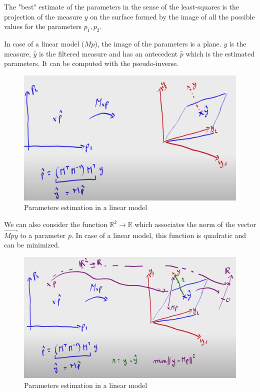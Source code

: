 The "best" estimate of the parameters in the sense of the least-squares is the projection of the measure $y$ on the surface formed by the image of all the possible values for the parameters $p_1, p_2$.



In case of a linear model ($Mp$), the image of the parameters is a plane. $y$ is the measure, $\hat{y}$ is the filtered measure and has an antecedent $\hat{p}$ which is the estimated parameters. It can be computed with the pseudo-inverse.

\begin{figure}[H]
    \centering
    \includegraphics[width=\linewidth]{content/estimation_linear_model.png}
    \caption{Parameters estimation in a linear model}
    \label{fig:params_estimation_linear_model}
\end{figure}

We can also consider the function $\mathbb{R}^2 \longrightarrow \mathbb{R}$ which associates the norm of the vector $\overrightarrow{Mpy}$ to a parameter $p$. In case of a linear model, this function is quadratic and can be minimized.

\begin{figure}[H]
    \centering
    \includegraphics[width=\linewidth]{content/estimation_linear_model_2.png}
    \caption{Parameters estimation in a linear model}
    \label{fig:params_estimation_linear_model_2}
\end{figure}



